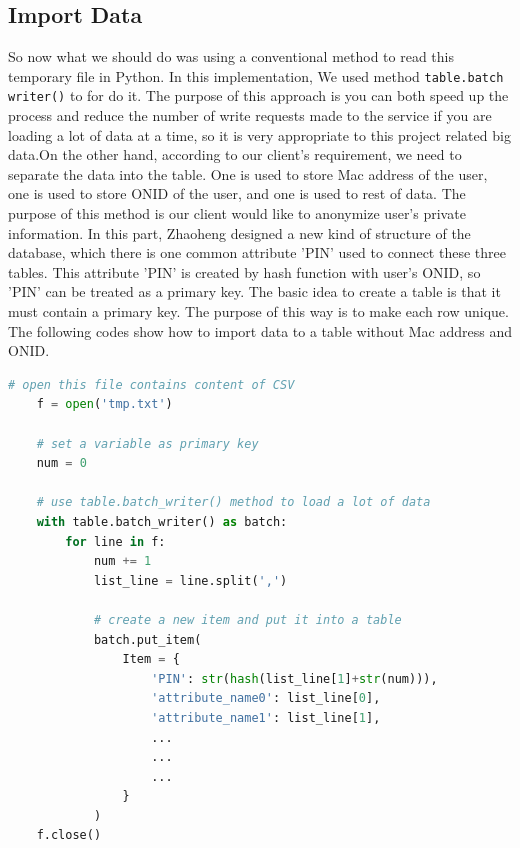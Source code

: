 \subsection{Import Data}
So now what we should do was using a conventional method to read this temporary file in Python. In this implementation, We used method \texttt{table.batch writer()} to for do it. The purpose of this approach is you can both speed up the process and reduce the number of write requests made to the service if you are loading a lot of data at a time, so it is very appropriate to this project related big data.On the other hand, according to our client's requirement, we need to separate the data into the table. One is used to store Mac address of the user, one is used to store ONID of the user, and one is used to rest of data. The purpose of this method is our client would like to anonymize user's private information. In this part, Zhaoheng designed a new kind of structure of the database, which there is one common attribute 'PIN' used to connect these three tables. This attribute 'PIN' is created by hash function with user's ONID, so 'PIN' can be treated as a primary key. The basic idea to create a table is that it must contain a primary key. The purpose of this way is to make each row unique. The following codes show how to import data to a table without Mac address and ONID.\\
\begin{lstlisting}[language=Python, caption=data.py]
	# open this file contains content of CSV
	f = open('tmp.txt')

	# set a variable as primary key
	num = 0

	# use table.batch_writer() method to load a lot of data
	with table.batch_writer() as batch:
		for line in f:
			num += 1
			list_line = line.split(',')
		
			# create a new item and put it into a table
			batch.put_item(
				Item = {
					'PIN': str(hash(list_line[1]+str(num))),
					'attribute_name0': list_line[0],
					'attribute_name1': list_line[1],
					...
					...
					...
				}
			)
	f.close()
\end{lstlisting}

